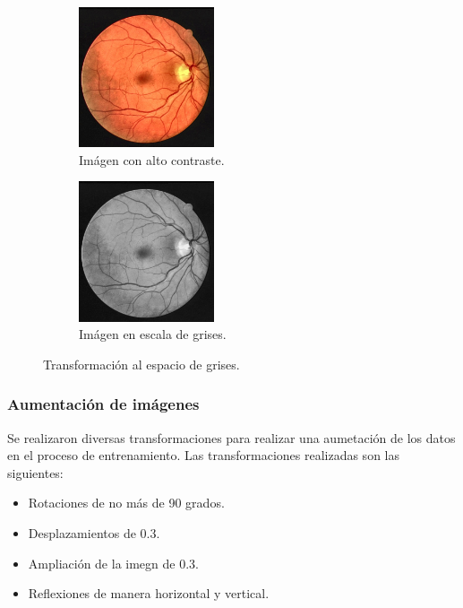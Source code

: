 \begin{figure}[H]
    \centering
    \begin{subfigure}{6cm}
        \centering
        \includegraphics[width=4cm]{Graphics/high_contrast.jpg}
        \caption{Imágen con alto contraste.}
    \end{subfigure}
    \begin{subfigure}{6cm}
        \centering
        \includegraphics[width=4cm]{Graphics/grayscale.jpg}
        \caption{Imágen en escala de grises.}
    \end{subfigure}
    \caption{Transformación al espacio de grises.}
    \label{fig:grayscale}
\end{figure}

\subsubsection{Aumentación de imágenes}

Se realizaron diversas transformaciones para realizar una aumetación de los datos en el proceso de entrenamiento. Las transformaciones realizadas son las siguientes:

\begin{itemize}
    \item Rotaciones de no más de 90 grados.
    \item Desplazamientos de 0.3.
    \item Ampliación de la imegn de 0.3.
    \item Reflexiones de manera horizontal y vertical.
\end{itemize}